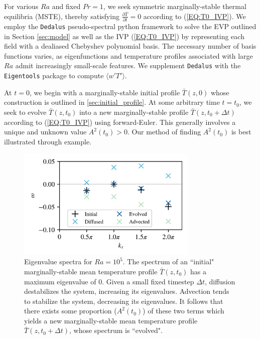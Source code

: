 \documentclass[reprint,amsmath,amssymb,aps]{revtex4-1}
\begin{document}
For various $Ra$ and fixed $Pr = 1$, we seek symmetric marginally-stable thermal equilibria (MSTE), thereby satisfying $\frac{\partial \bar{T}}{\partial t} = 0$ according to (\ref{EQ:T0_IVP}). 
We employ the \texttt{Dedalus} pseudo-spectral python framework to solve the EVP outlined in Section \ref{sec:model} as well as the IVP (\ref{EQ:T0_IVP}) by representing each field with a dealiased Chebyshev polynomial basis. 
The necessary number of basis functions varies, as eigenfunctions and temperature profiles associated with large $Ra$ admit increasingly small-scale features. 
We supplement \texttt{Dedalus} with the \texttt{Eigentools} package to compute $\langle w' T' \rangle$.

At $t = 0$, we begin with a marginally-stable initial profile $\bar{T}(z, 0)$ whose construction is outlined in \ref{sec:initial_profile}. 
At some arbitrary time $t = t_0$, we seek to evolve $\bar{T}(z, t_0)$ into a new marginally-stable profile $\bar{T}(z, t_0 + \Delta t)$ according to (\ref{EQ:T0_IVP}) using forward-Euler. 
This generally involves a unique and unknown value $A^2(t_0) > 0$. 
Our method of finding $A^2(t_0)$ is best illustrated through example.

\begin{figure}
    \includegraphics[width=3.4in]{EV_spectrum_ol.png}
    \caption{Eigenvalue spectra for $Ra = 10^5$. The spectrum of an ``initial" marginally-stable mean temperature profile $\bar{T}(z, t_0)$ has a maximum eigenvalue of 0. 
    Given a small fixed timestep $\Delta t$, diffusion destabilizes the system, increasing its eigenvalues. 
    Advection tends to stabilize the system, decreasing its eigenvalues. 
    It follows that there exists some proportion ($A^2(t_0)$) of these two terms which yields a new marginally-stable mean temperature profile $\bar{T}(z, t_0 + \Delta t)$, whose spectrum is ``evolved".}
    \label{fig:iteration_spectra} 
\end{figure}
\end{document}
